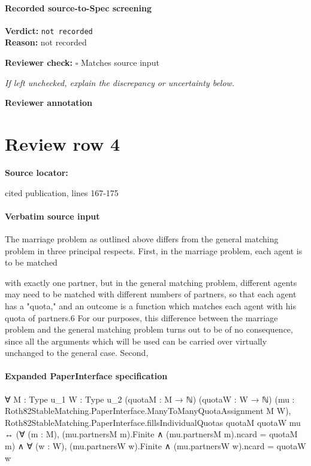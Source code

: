 \documentclass[10pt]{article}
\newcommand{\reviewerbox}{%
  \par\noindent\fbox{\parbox{0.96\linewidth}{\rule{0pt}{0.38in}}}\par
}
\newcommand{\reviewmatch}[1]{%
  \par\noindent\textbf{Reviewer check:} $\square$\; #1\par
  \noindent\emph{If left unchecked, explain the discrepancy or uncertainty below.}\par
}
\begin{document}
\paragraph{Recorded source-to-Spec screening}
\textbf{Verdict:} \texttt{not recorded}
\\
\textbf{Reason:} not recorded
\reviewmatch{Matches source input}
\noindent\textbf{Reviewer annotation}\par
\reviewerbox
\clearpage
\hypertarget{source-claim-ee021b20b26b9efe}{}
\section*{Review row 4}
\textbf{Source locator:} {\footnotesize\raggedright cited publication, lines 167-\allowbreak{}175\par}
\paragraph{Verbatim source input}
\begin{ReviewVerbatim}
The marriage problem as outlined above differs from the general matching problem
in three principal respects. First, in the marriage problem, each agent is to be matched

with exactly one partner, but in the general matching problem, different agents may
need to be matched with different numbers of partners, so that each agent has a
"quota," and an outcome is a function which matches each agent with his quota of
partners.6 For our purposes, this difference between the marriage problem and the
general matching problem turns out to be of no consequence, since all the arguments
which will be used can be carried over virtually unchanged to the general case. Second,
\end{ReviewVerbatim}


\paragraph{Expanded PaperInterface specification}
\begin{ReviewVerbatim}
∀ {M : Type u_1} {W : Type u_2} (quotaM : M → ℕ) (quotaW : W → ℕ)
  (mu : Roth82StableMatching.PaperInterface.ManyToManyQuotaAssignment M W),
  Roth82StableMatching.PaperInterface.fillsIndividualQuotas quotaM quotaW mu ↔
    (∀ (m : M), (mu.partnersM m).Finite ∧ (mu.partnersM m).ncard = quotaM m) ∧
      ∀ (w : W), (mu.partnersW w).Finite ∧ (mu.partnersW w).ncard = quotaW w
\end{ReviewVerbatim}
\end{document}
